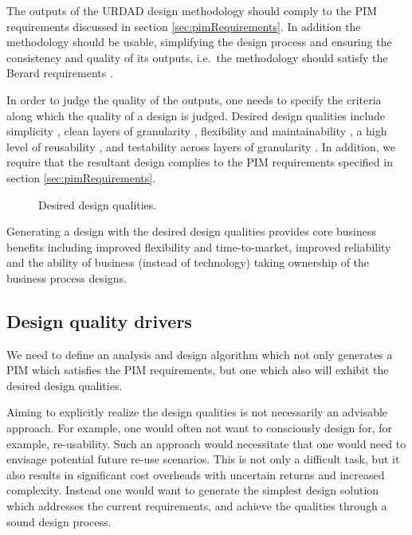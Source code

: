 \documentclass{IOS-Book-Article}
\begin{document}
The outputs of the URDAD design methodology should comply to the PIM
requirements discussed in section \ref{sec:pimRequirements}. In addition the
methodology should be usable, simplifying the design
process and ensuring the consistency and quality of its outputs,
i.e.\ the methodology should satisfy the Berard requirements
\cite{berard:whatIsMethodology}.

In order to judge the quality of the outputs, one needs to specify the criteria
along which the quality of a design is judged.
Desired design qualities include simplicity
\cite{wirfs-brock:designSimplicity}, clean layers of granularity
\cite{martin:agileSoftwareDevelopment, artus:soaRealization},
flexibility and maintainability
\cite{hordijk:maintainabilityFactors,misra:drivingMaintainableDesign},
a high level of reusability \cite{lenz:softwareReuse}, and
testability across layers of granularity \cite{voas:softwareTestability}. In
addition, we require that the resultant design complies to the PIM
requirements specified in section  \ref{sec:pimRequirements}.

\begin{figure}
  \centering
  \caption{Desired design qualities.}
  \label{fig:designActivities}
\end{figure}

Generating a design with the desired design qualities provides core business
benefits including improved flexibility and time-to-market,
improved reliability and the ability of business (instead of technology)
taking ownership of the business process designs.


\subsection{Design quality drivers}

We need to define an analysis and design algorithm which not only generates a
PIM which satisfies the PIM requirements, but one which also will exhibit
the desired design qualities.

Aiming to explicitly realize the design qualities is not necessarily an advisable
approach. For example,  one would often not want to
consciously design for, for example, re-usability. Such an approach would
necessitate that one would need to envisage potential future re-use scenarios.
This is not only a difficult task, but it also results in significant cost
overheads with uncertain returns and increased complexity. Instead one would want
to generate the simplest design solution which addresses the current requirements,
and achieve the qualities through a sound design process.
\end{document}
